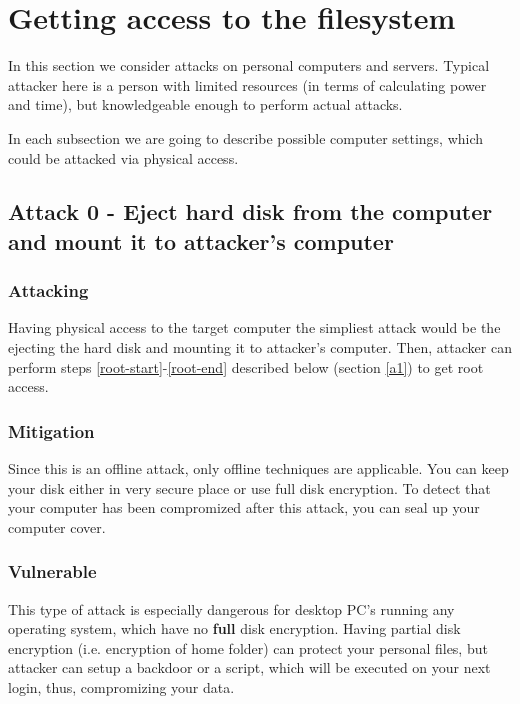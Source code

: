 \section{Getting access to the filesystem}\label{a}
In this section we consider attacks on personal computers and servers. Typical attacker here is a person with limited resources (in terms of calculating power and time), but knowledgeable enough to perform actual attacks. 

In each subsection we are going to describe possible computer settings, which could be attacked via physical access.

\subsection{Attack 0 - Eject hard disk from the computer and mount it to attacker's computer} \label{a0}

\subsubsection*{Attacking}
Having physical access to the target computer the simpliest attack would be the ejecting the hard disk and mounting it to attacker's computer. Then, attacker can perform steps \ref{root-start}-\ref{root-end} described below (section \ref{a1}) to get root access.

\subsubsection*{Mitigation}
Since this is an offline attack, only offline techniques are applicable. You can keep your disk either in very secure place or use full disk encryption. To detect that your computer has been compromized after this attack, you can seal up your computer cover.

\subsubsection*{Vulnerable}
This type of attack is especially dangerous for desktop PC's running any operating system, which have no \textbf{full} disk encryption. Having partial disk encryption (i.e. encryption of home folder) can protect your personal files, but attacker can setup a backdoor or a script, which will be executed on your next login, thus, compromizing your data.

